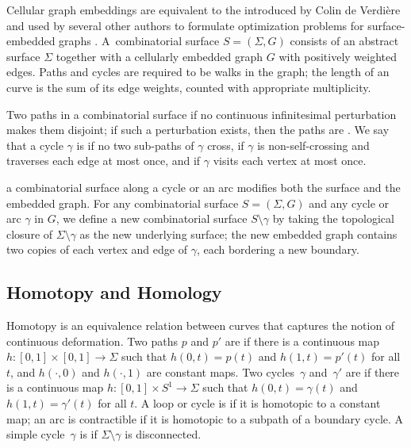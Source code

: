 \documentclass{sig-alternate}
\def\note#1{\EMPH{\color{red} #1}}
\begin{document}
Cellular graph embeddings are equivalent to the  introduced by Colin de Verdi\`ere~\cite{c-rcds-03} and used by several other authors to formulate optimization problems for surface-embedded graphs \cite{cc-msspg-07, cdem-fotc-08, cm-fsnsn-07, ccelw-scsih-08, ce-tspcs-06, cl-opdsh-03, cl-oslos-05, cl-opdsh-07, eh-ocsd-04, ew-gohhg-05, ew-csec-08, k-csnco-06}.  A~combinatorial surface $S = (\Sigma, G)$ consists of an abstract surface $\Sigma$ together with a cellularly embedded graph $G$ with positively weighted edges.  Paths and cycles are required to be walks in the graph; the length of an curve is the sum of its edge weights, counted with appropriate multiplicity.

Two paths in a combinatorial surface  if no continuous infinitesimal perturbation makes them disjoint; if such a perturbation exists, then the paths are .  We say that a cycle $\gamma$ is  if no two sub-paths of $\gamma$ cross,  if $\gamma$ is non-self-crossing and traverses each edge at most once, and  if $\gamma$ visits each vertex at most once.

 a combinatorial surface along a cycle or an arc modifies both the surface and the embedded graph.  For any combinatorial surface $S = (\Sigma,G)$ and any cycle or arc $\gamma$ in $G$, we define a new combinatorial surface $S\setminus\gamma$ by taking the topological closure of $\Sigma\setminus\gamma$ as the new underlying surface; the new embedded graph contains two copies of each vertex and edge of $\gamma$, each bordering a new boundary.


\subsection{Homotopy and Homology}

Homotopy is an equivalence relation between curves that captures the notion of continuous deformation.  Two paths $p$ and $p'$ are  if there is a continuous map $h\colon[0,1]\times[0,1] \to \Sigma$ such that $h(0,t)=p(t)$ and $h(1,t)=p'(t)$ for all $t$, and $h(\cdot,0)$ and $h(\cdot,1)$ are constant maps.  Two cycles~$\gamma$ and~$\gamma'$ are  if there is a continuous map $h\colon{[0,1]\times S^1 \to \Sigma}$ such that $h(0,t)=\gamma(t)$ and $h(1,t)=\gamma'(t)$ for all $t$.  A loop or cycle is  if it is homotopic to a constant map; an arc is contractible if it is homotopic to a subpath of a boundary cycle.  A simple cycle~$\gamma$ is  if $\Sigma\setminus\gamma$ is disconnected.
\end{document}
